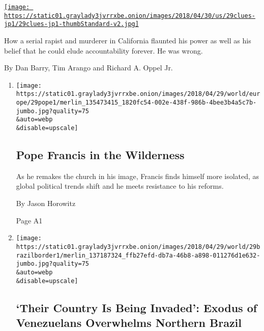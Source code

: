 \begin{enumerate}
\begin{enumerate}
    \href{/2018/04/28/us/golden-state-killer-joseph-deangelo.html}{\texttt{[image: https://static01.graylady3jvrrxbe.onion/images/2018/04/30/us/29clues-jp1/29clues-jp1-thumbStandard-v2.jpg]}}

    How a serial rapist and murderer in California flaunted his power as
    well as his belief that he could elude accountability forever. He
    was wrong.

    By Dan Barry, Tim Arango and Richard A. Oppel Jr.
  \end{enumerate}
\end{enumerate}

\begin{enumerate}
\def\labelenumi{\arabic{enumi}.}
\item
  \href{/2018/04/28/world/europe/pope-francis-vatican-roman-catholics-populism.html}{}

  \texttt{[image: https://static01.graylady3jvrrxbe.onion/images/2018/04/29/world/europe/29pope1/merlin\_135473415\_1820fc54-002e-438f-986b-4bee3b4a5c7b-jumbo.jpg?quality=75\\\&auto=webp\\\&disable=upscale]}

  \hypertarget{pope-francis-in-the-wilderness}{%
  \subsection{Pope Francis in the
  Wilderness}\label{pope-francis-in-the-wilderness}}

  As he remakes the church in his image, Francis finds himself more
  isolated, as global political trends shift and he meets resistance to
  his reforms.

  By Jason Horowitz

  Page A1
\item
  \href{/2018/04/28/world/americas/venezuela-brazil-migrants.html}{}

  \texttt{[image: https://static01.graylady3jvrrxbe.onion/images/2018/04/29/world/29brazilborder1/merlin\_137187324\_ffb27efd-db7a-46b8-a898-011276d1e632-jumbo.jpg?quality=75\\\&auto=webp\\\&disable=upscale]}

  \hypertarget{their-country-is-being-invaded-exodus-of-venezuelans-overwhelms-northern-brazil}{%
  \subsection{`Their Country Is Being Invaded': Exodus of Venezuelans
  Overwhelms Northern
  Brazil}\label{their-country-is-being-invaded-exodus-of-venezuelans-overwhelms-northern-brazil}}


\end{enumerate}
